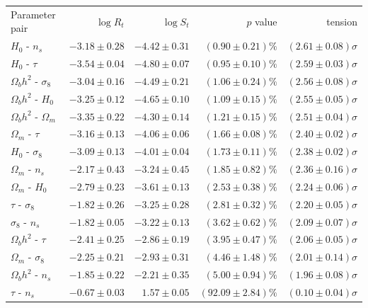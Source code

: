 \documentclass[%
 reprint,
 amsmath,amssymb,
 aps,
]{revtex4-2}
\begin{document}
\begin{table}
\begin{ruledtabular}
\begin{tabular}{l r r r r}
    Parameter pair & $\log R_t$ & $\log S_t$ & $p$ value & tension \\
    \colrule
    $H_0$ - $n_s$               &	$-3.18 \pm 0.28$ & $-4.42 \pm 0.31$ & $(0.90 \pm 0.21)\%$ & $(2.61 \pm 0.08)\sigma$ \\
    $H_0$ - $\tau$              &	$-3.54 \pm 0.04$ & $-4.80 \pm 0.07$ & $(0.95 \pm 0.10)\%$ & $(2.59 \pm 0.03)\sigma$ \\
    $\Omega_b h^2$ - $\sigma_8$ &	$-3.04 \pm 0.16$ & $-4.49 \pm 0.21$ & $(1.06 \pm 0.24)\%$ & $(2.56 \pm 0.08)\sigma$ \\
    $\Omega_b h^2$ - $H_0$      &	$-3.25 \pm 0.12$ & $-4.65 \pm 0.10$ & $(1.09 \pm 0.15)\%$ & $(2.55 \pm 0.05)\sigma$ \\
    $\Omega_b h^2$ - $\Omega_m$ &	$-3.35 \pm 0.22$ & $-4.30 \pm 0.14$ & $(1.21 \pm 0.15)\%$ & $(2.51 \pm 0.04)\sigma$ \\
    $\Omega_m$ - $\tau$         &	$-3.16 \pm 0.13$ & $-4.06 \pm 0.06$ & $(1.66 \pm 0.08)\%$ & $(2.40 \pm 0.02)\sigma$ \\
    $H_0$ - $\sigma_8$          &	$-3.09 \pm 0.13$ & $-4.01 \pm 0.04$ & $(1.73 \pm 0.11)\%$ & $(2.38 \pm 0.02)\sigma$ \\
    $\Omega_m$ - $n_s$          &	$-2.17 \pm 0.43$ & $-3.24 \pm 0.45$ & $(1.85 \pm 0.82)\%$ & $(2.36 \pm 0.16)\sigma$ \\
    $\Omega_m$ - $H_0$          &	$-2.79 \pm 0.23$ & $-3.61 \pm 0.13$ & $(2.53 \pm 0.38)\%$ & $(2.24 \pm 0.06)\sigma$ \\
    $\tau$ - $\sigma_8$         &	$-1.82 \pm 0.26$ & $-3.25 \pm 0.28$ & $(2.81 \pm 0.32)\%$ & $(2.20 \pm 0.05)\sigma$ \\
    $\sigma_8$ - $n_s$          &	$-1.82 \pm 0.05$ & $-3.22 \pm 0.13$ & $(3.62 \pm 0.62)\%$ & $(2.09 \pm 0.07)\sigma$ \\
    $\Omega_b h^2$ - $\tau$     &	$-2.41 \pm 0.25$ & $-2.86 \pm 0.19$ & $(3.95 \pm 0.47)\%$ & $(2.06 \pm 0.05)\sigma$ \\
    $\Omega_m$ - $\sigma_8$     &	$-2.25 \pm 0.21$ & $-2.93 \pm 0.31$ & $(4.46 \pm 1.48)\%$ & $(2.01 \pm 0.14)\sigma$ \\
    $\Omega_b h^2$ - $n_s$      &	$-1.85 \pm 0.22$ & $-2.21 \pm 0.35$ & $(5.00 \pm 0.94)\%$ & $(1.96 \pm 0.08)\sigma$ \\
    $\tau$ - $n_s$              &	$-0.67 \pm 0.03$ & $1.57 \pm 0.05$ & $(92.09 \pm 2.84)\%$ & $(0.10 \pm 0.04)\sigma$ \\

\end{tabular}
\end{ruledtabular}
\end{table}
\end{document}
